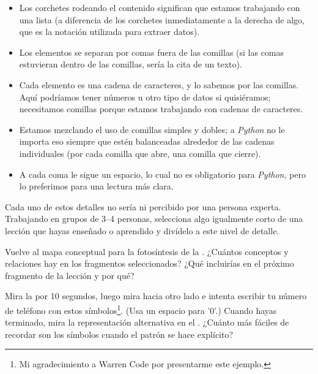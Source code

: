\begin{itemize}

\item
  Los corchetes rodeando el contenido significan que estamos trabajando con una lista
  (a diferencia de los corchetes inmediatamente a la derecha de algo,
  que es la notación utilizada para extraer datos).

\item
  Los elementos se separan por comas fuera de las comillas
  (si las comas estuvieran dentro de las comillas, sería la cita de un texto).

\item
  Cada elemento es una cadena de caracteres,
  y lo sabemos por las comillas.
  Aquí podríamos tener números u otro tipo de datos si quisiéramos;
  necesitamos comillas porque estamos trabajando con cadenas de caracteres.

\item
  Estamos mezclando el uso de comillas simples y dobles;
  a \emph{Python} no le importa eso siempre que estén balanceadas alrededor 
  de las cadenas individuales (por cada comilla que abre, una comilla que cierre).

\item
  A cada coma le sigue un espacio,
  lo cual no es obligatorio para \emph{Python},
  pero lo preferimos para una lectura más clara.

\end{itemize}

Cada uno de estos detalles no sería ni percibido por una persona experta.
Trabajando en grupos de  3--4 personas,
selecciona algo igualmente corto de una lección que hayas enseñado o aprendido
y divídelo a este nivel de detalle.


Vuelve al mapa conceptual para la fotosíntesis de la .
¿Cuántos conceptos y relaciones hay en los fragmentos seleccionados?
¿Qué incluirías en el próximo fragmento de la lección y por qué?


Mira la  por 10 segundos,
luego mira hacia otro lado e intenta escribir tu número de teléfono con estos símbolos\footnote{
  Mi agradecimiento a Warren Code por presentarme este ejemplo.
}.
(Usa un espacio para '0'.)
Cuando hayas terminado,
mira la representación alternativa en el .
¿Cuánto más fáciles de recordar son los símbolos cuando el patrón se hace explícito?


